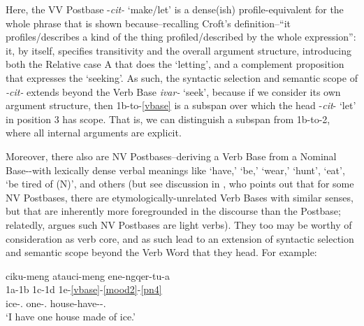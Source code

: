 \documentclass[output=paper]{langscibook}
\begin{document}
Here, the VV Postbase -\textit{cit-} `make/let' is a dense(ish) profile-equivalent for the whole phrase that is shown because--recalling Croft's definition--``it profiles{\slash}describes a kind of the thing profiled/described by the whole expression'': it, by itself, specifies transitivity and the overall argument structure, introducing both the Relative case A that does the `letting', and a complement proposition that expresses the `seeking'. As such, the syntactic selection and semantic scope of \textit{{}-cit-} extends beyond the Verb Base \textit{ivar-} `seek', because if we consider its own argument structure, then 1b-to-\ref{vbase} is a subspan over which the head -\textit{cit}{}- `let' in position 3 has scope. That is, we can distinguish a subspan from 1b-to-2, where all internal arguments are explicit.

Moreover, there also are NV Postbases--deriving a Verb Base from a Nominal Base-{}-with lexically dense verbal meanings like `have,' `be,' `wear,' `hunt', `eat', `be tired of (N)', and others (but see discussion in \citealt{Mithun1998}, who points out that for some NV Postbases, there are etymologically-unrelated Verb Bases with similar senses, but that are inherently more foregrounded in the discourse than the Postbase; relatedly, \citealt{Johns2007} argues such NV Postbases are light verbs). They too may be worthy of consideration as verb core, and as such lead to an extension of syntactic selection and semantic scope beyond the Verb Word that they head. For example:

\ea\label{ex:key:55}
\glll ciku-meng atauci-meng ene-ngqer-tu-a\\
    1a-1b 1c-1d 1e-\ref{vbase}-\ref{mood2}-\ref{pn4} \\
     ice-\Ins.\Sg{} one-\Ins.\Sg{} house-have-\Ind{}-\Tsg.\Sarg{}\\
\glt `I have one house made of ice.' \hfill \citep[352]{Woodbury2017}
\z
\end{document}
